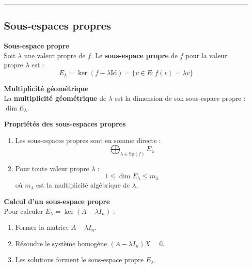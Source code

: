 \documentclass[../PolyS4.tex]{subfiles}
\begin{document}
\vspace{1em}
\hrule
\vspace{1em}

\subsection{Sous-espaces propres}

\begin{Def}\textbf{Sous-espace propre}\\

Soit $\lambda$ une valeur propre de $f$. Le \textbf{sous-espace propre} de $f$ pour la valeur propre $\lambda$ est :
$$E_\lambda = \ker(f - \lambda \mathrm{Id}) = \{v \in E : f(v) = \lambda v\}$$
\end{Def}

\begin{Def}\textbf{Multiplicité géométrique}\\

La \textbf{multiplicité géométrique} de $\lambda$ est la dimension de son sous-espace propre : $\dim E_\lambda$.
\end{Def}

\begin{Prop}\textbf{Propriétés des sous-espaces propres}\\

\begin{enumerate}
    \item Les sous-espaces propres sont en somme directe :
    $$\bigoplus_{\lambda \in \mathrm{Sp}(f)} E_\lambda$$
    \item Pour toute valeur propre $\lambda$ :
    $$1 \leq \dim E_\lambda \leq m_\lambda$$
    où $m_\lambda$ est la multiplicité algébrique de $\lambda$.
\end{enumerate}
\end{Prop}

\begin{Meth}\textbf{Calcul d'un sous-espace propre}\\

Pour calculer $E_\lambda = \ker(A - \lambda I_n)$ :
\begin{enumerate}
    \item Former la matrice $A - \lambda I_n$.
    \item Résoudre le système homogène $(A - \lambda I_n)X = 0$.
    \item Les solutions forment le sous-espace propre $E_\lambda$.
\end{enumerate}
\end{Meth}
\end{document}

